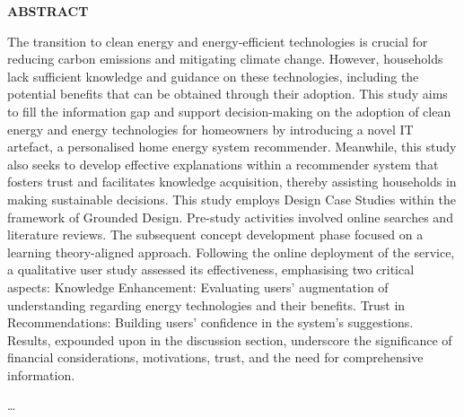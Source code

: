  \setcounter{page}{3}
\begin{center}
{\Large{\bf{ABSTRACT}}}
\end{center}

\noindent

The transition to clean energy and energy-efficient technologies is crucial for reducing carbon emissions and mitigating climate change. 
However, households lack sufficient knowledge and guidance on these technologies, including the potential benefits that can be obtained through their adoption.
This study aims to fill the information gap and support decision-making on the adoption of clean energy and energy technologies for homeowners by introducing a novel IT artefact, a personalised home energy system recommender.
Meanwhile, this study also seeks to develop effective explanations within a recommender system that fosters trust and facilitates knowledge acquisition, thereby assisting households in making sustainable decisions.
This study employs Design Case Studies within the framework of Grounded Design. 
Pre-study activities involved online searches and literature reviews. 
The subsequent concept development phase focused on a learning theory-aligned approach. 
Following the online deployment of the service, a qualitative user study assessed its effectiveness, emphasising two critical aspects: 
Knowledge Enhancement: Evaluating users' augmentation of understanding regarding energy technologies and their benefits.
Trust in Recommendations: Building users' confidence in the system's suggestions.
Results, expounded upon in the discussion section, underscore the significance of financial considerations, motivations, trust, and the need for comprehensive information. 


\dots
\clearpage